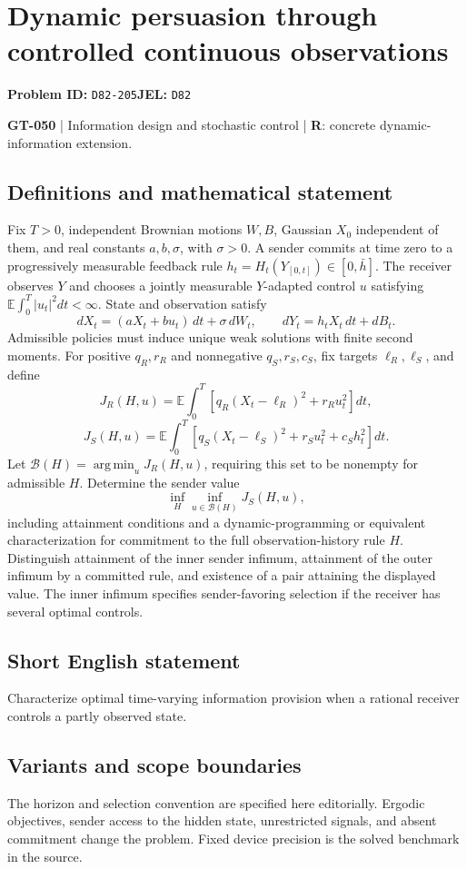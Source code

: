 \documentclass[11pt,a4paper]{article}
\begin{document}
\section*{Dynamic persuasion through controlled continuous observations}
\textbf{Problem ID:} \texttt{D82-205}\quad \textbf{JEL:} \texttt{D82}\par
\label{problem:OP-0180}
\label{game:GT-050}
{\sffamily\small\color{muted}
\textbf{GT-050} | Information design and stochastic control | \textbf{R}: concrete dynamic-information extension.
\par}
\subsection*{Definitions and mathematical statement}
Fix $T>0$, independent Brownian motions $W,B$, Gaussian $X_0$ independent of them, and real constants $a,b,\sigma$, with $\sigma>0$. A sender commits at time zero to a progressively measurable feedback rule $h_t=H_t(Y_{[0,t]})\in[0,\bar h]$. The receiver observes $Y$ and chooses a jointly measurable $Y$-adapted control $u$ satisfying $\mathbb E\int_0^T|u_t|^2dt<\infty$. State and observation satisfy
\[
 dX_t=(aX_t+bu_t)\,dt+\sigma\,dW_t,
 \qquad dY_t=h_tX_t\,dt+dB_t.
\]
Admissible policies must induce unique weak solutions with finite second moments. For positive $q_R,r_R$ and nonnegative $q_S,r_S,c_S$, fix targets $\ell_R,\ell_S$, and define
\[
 J_R(H,u)=\mathbb E\int_0^T[q_R(X_t-\ell_R)^2+r_Ru_t^2]dt,
\]
\[
 J_S(H,u)=\mathbb E\int_0^T[q_S(X_t-\ell_S)^2+r_Su_t^2+c_Sh_t^2]dt.
\]
Let $\mathcal B(H)=\operatorname*{arg\,min}_u J_R(H,u)$, requiring this set to be nonempty for admissible $H$. Determine the sender value
\[
 \inf_H\inf_{u\in\mathcal B(H)}J_S(H,u),
\]
including attainment conditions and a dynamic-programming or equivalent characterization for commitment to the full observation-history rule $H$. Distinguish attainment of the inner sender infimum, attainment of the outer infimum by a committed rule, and existence of a pair attaining the displayed value. The inner infimum specifies sender-favoring selection if the receiver has several optimal controls.
\subsection*{Short English statement}
Characterize optimal time-varying information provision when a rational receiver controls a partly observed state.
\subsection*{Variants and scope boundaries}
The horizon and selection convention are specified here editorially. Ergodic objectives, sender access to the hidden state, unrestricted signals, and absent commitment change the problem. Fixed device precision is the solved benchmark in the source.
\end{document}
